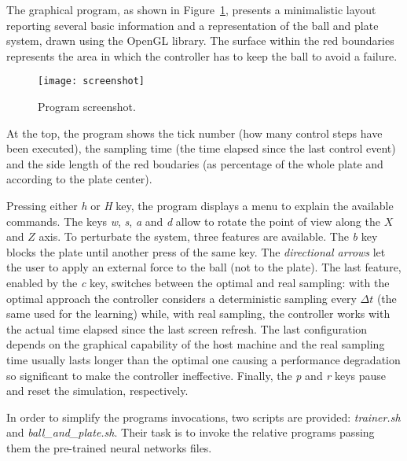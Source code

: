 The graphical program, as shown in Figure~\ref{fig:screenshot}, presents a 
minimalistic layout reporting several basic information and a representation of
the ball and plate system, drawn using the OpenGL library.
The surface within the red boundaries represents the area
in which the controller has to keep the ball to avoid a failure.

\begin{figure}[htb]
  \centering
  \texttt{[image: screenshot]}
  \caption{Program screenshot.}
  \label{fig:screenshot}
\end{figure}

At the top, the program shows the tick number (how many control steps have been
executed), the sampling time (the time elapsed since the last control
event) and the side length of the red boudaries (as percentage of the whole
plate and according to the plate center).

Pressing either \emph{h} or \emph{H} key, the program displays a menu to
explain the available commands.
The keys \emph{w}, \emph{s}, \emph{a} and \emph{d} allow to rotate the 
point of view along the $X$ and $Z$ axis.
To perturbate the system, three features are available.
The \emph{b} key blocks the plate until another press of the same key.
The \emph{directional arrows} let the user to apply an external force to the
ball (not to the plate).
The last feature, enabled by the \emph{c} key, switches between the optimal and
real sampling: with the optimal approach the controller considers a
deterministic sampling every $\Delta t$ (the same used for the learning) while,
with real sampling, the controller works with the actual time elapsed since
the last screen refresh.
The last configuration depends on the graphical capability of the host machine
and the real sampling time usually lasts longer than the optimal one
causing a performance degradation so significant to make the controller
ineffective.
Finally, the \emph{p} and \emph{r} keys pause and reset the simulation,
respectively.

In order to simplify the programs invocations, two scripts are provided: 
\emph{trainer.sh} and \emph{ball\_and\_plate.sh}. Their task is to invoke the
relative programs passing them the pre-trained neural networks files.


